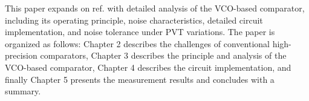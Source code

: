 \documentclass[letterpaper, 10 pt, conference]{ieeeconf}  %
\begin{document}
This paper expands on ref.\cite{yoshioka201413b} with detailed analysis of the VCO-based comparator, including its operating principle, noise characteristics, detailed circuit implementation, and noise tolerance under PVT variations.
The paper is organized as follows: Chapter 2 describes the challenges of conventional high-precision comparators, Chapter 3 describes the principle and analysis of the VCO-based comparator, Chapter 4 describes the circuit implementation, and finally Chapter 5 presents the measurement results and concludes with a summary.



\end{document}
